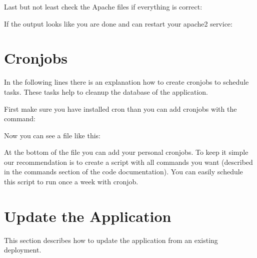 \documentclass[letterpaper,10pt,english]{sphinxmanual}
\begin{document}
Last but not least check the Apache files if everything is correct:
\begin{quote}

\end{quote}

If the output looks like  you are done and can restart your apache2
service:
\begin{quote}

\end{quote}


\section{Cronjobs}
\label{\detokenize{masterAdminDoc:cronjobs}}
In the following lines there is an explanation how to create cronjobs to
schedule tasks. These tasks help to cleanup the database of the application.

First make sure you have installed cron than you can add cronjobs
with the command:
\begin{quote}

\end{quote}

Now you can see a file like this:

At the bottom of the file you can add your personal cronjobs.
To keep it simple our recommendation is to create a script with all commands you
want (described in the commands section of the code documentation).
You can easily schedule this script to run once a week with cronjob.
\begin{quote}

\end{quote}


\section{Update the Application}
\label{\detokenize{masterAdminDoc:update-the-application}}
This section describes how to update the application from an existing deployment.
\end{document}
